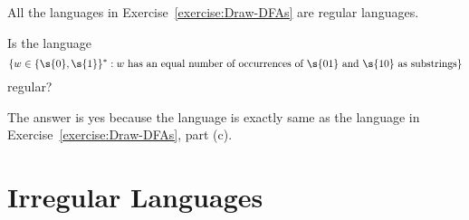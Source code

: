 \begin{flex}

\begin{example} \label{example:Some-examples-of-regular-languages}
All the languages in Exercise~\ref{exercise:Draw-DFAs} are regular languages.
\end{example}
\end{flex}


\begin{flex}
\begin{exercise} \label{exercise:Equal-number-of-01s-and-10s}
Is the language
\[
    \{w \in \{\s{0},\s{1}\}^* : w \text{ has an equal number of occurrences of $\s{01}$ and $\s{10}$ as substrings}\}
\]
regular?
\end{exercise}


\begin{solution}
The answer is yes because the language is exactly same as the language in Exercise~\ref{exercise:Draw-DFAs}, part (c).
\end{solution}
\end{flex}







\section{Irregular Languages}


